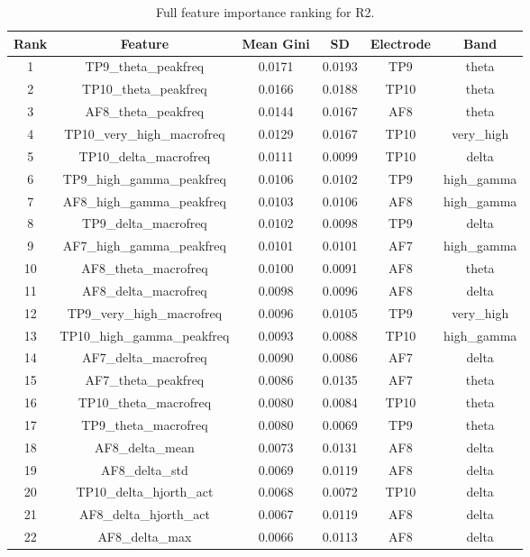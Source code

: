 \begin{table}[hptb]
\small
\centering
\begin{table}
\caption{Full feature importance ranking for R2.}
\label{tab:app_a_r2}
\begin{tabular}{cccccc}
\toprule
Rank & Feature & Mean Gini & SD & Electrode & Band \\
\midrule
1 & TP9_theta_peakfreq & 0.0171 & 0.0193 & TP9 & theta \\
2 & TP10_theta_peakfreq & 0.0166 & 0.0188 & TP10 & theta \\
3 & AF8_theta_peakfreq & 0.0144 & 0.0167 & AF8 & theta \\
4 & TP10_very_high_macrofreq & 0.0129 & 0.0167 & TP10 & very_high \\
5 & TP10_delta_macrofreq & 0.0111 & 0.0099 & TP10 & delta \\
6 & TP9_high_gamma_peakfreq & 0.0106 & 0.0102 & TP9 & high_gamma \\
7 & AF8_high_gamma_peakfreq & 0.0103 & 0.0106 & AF8 & high_gamma \\
8 & TP9_delta_macrofreq & 0.0102 & 0.0098 & TP9 & delta \\
9 & AF7_high_gamma_peakfreq & 0.0101 & 0.0101 & AF7 & high_gamma \\
10 & AF8_theta_macrofreq & 0.0100 & 0.0091 & AF8 & theta \\
11 & AF8_delta_macrofreq & 0.0098 & 0.0096 & AF8 & delta \\
12 & TP9_very_high_macrofreq & 0.0096 & 0.0105 & TP9 & very_high \\
13 & TP10_high_gamma_peakfreq & 0.0093 & 0.0088 & TP10 & high_gamma \\
14 & AF7_delta_macrofreq & 0.0090 & 0.0086 & AF7 & delta \\
15 & AF7_theta_peakfreq & 0.0086 & 0.0135 & AF7 & theta \\
16 & TP10_theta_macrofreq & 0.0080 & 0.0084 & TP10 & theta \\
17 & TP9_theta_macrofreq & 0.0080 & 0.0069 & TP9 & theta \\
18 & AF8_delta_mean & 0.0073 & 0.0131 & AF8 & delta \\
19 & AF8_delta_std & 0.0069 & 0.0119 & AF8 & delta \\
20 & TP10_delta_hjorth_act & 0.0068 & 0.0072 & TP10 & delta \\
21 & AF8_delta_hjorth_act & 0.0067 & 0.0119 & AF8 & delta \\
22 & AF8_delta_max & 0.0066 & 0.0113 & AF8 & delta \\

\end{tabular}
\end{table}
\end{table}
